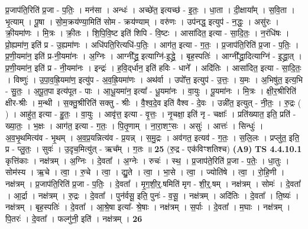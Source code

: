 \documentclass[17pt]{extarticle}
\begin{document}
                  प्र॒जाप॑ति॒रिति॑ प्र॒जा - प॒तिः॒ । मन॑सा । अन्धः॑ । अच्छे॑त॒ इत्यच्छ॑ - इ॒तः॒ । धा॒ता । दी॒क्षाया᳚म् । स॒वि॒ता । भृ॒त्याम् । पू॒षा । सो॒म॒क्रय॑ण्या॒मिति॑ सोम - क्रय॑ण्याम् । वरु॑णः । उप॑नद्ध॒ इत्युप॑ - न॒द्धः॒ । असु॑रः । क्री॒यमा॑णः । मि॒त्रः । क्री॒तः । शि॒पि॒वि॒ष्ट इति॑ शिपि - वि॒ष्टः । आसा॑दित॒ इत्या - सा॒दि॒तः॒ । न॒रंधि॑षः । प्रो॒ह्यमा॑ण॒ इति॑ प्र - उ॒ह्यमा॑णः । अधि॑पति॒रित्यधि॑-प॒तिः॒ । आग॑त॒ इत्या - ग॒तः॒ । प्र॒जाप॑ति॒रिति॑ प्र॒जा - प॒तिः॒ । प्र॒णी॒यमा॑न॒ इति॑ प्र-नी॒यमा॑नः । अ॒ग्निः । आग्नी᳚द्ध्र॒ इत्याग्नि॑-इ॒द्ध्रे॒ । बृह॒स्पतिः॑ । आग्नी᳚द्ध्रा॒दित्याग्नि॑ - इ॒द्ध्रा॒त् । प्र॒णी॒यमा॑न॒ इति॑ प्र - नी॒यमा॑नः । इन्द्रः॑ । ह॒वि॒द्‌र्धान॒ इति॑ हविः - धाने᳚ । अदि॑तिः । आसा॑दित॒ इत्या - सा॒दि॒तः॒ । विष्णुः॑ । उ॒पा॒व॒ह्रि॒यमा॑ण॒ इत्यु॑प - अ॒व॒ह्रि॒यमा॑णः । अथ॑र्वा । उपो᳚त्त॒ इत्युप॑ - उ॒त्तः॒ । य॒मः । अ॒भिषु॑त॒ इत्य॒भि - सु॒तः॒ । अ॒पू॒त॒पा इत्य॑पूत - पाः । आ॒धू॒यमा॑न॒ इत्या᳚ - धू॒यमा॑नः । वा॒युः । पू॒यमा॑नः । मि॒त्रः । क्षी॒र॒श्रीरिति॑ क्षीर-श्रीः । म॒न्थी । स॒क्तु॒श्रीरिति॑ सक्तु - श्रीः । वै॒श्व॒दे॒व इति॑ वैश्व - दे॒वः । उन्नी॑त॒ इत्युत् - नी॒तः॒ । रु॒द्रः ( ) । आहु॑त॒ इत्या - हु॒तः॒ । वा॒युः । आवृ॑त्त॒ इत्या - वृ॒त्तः॒ । नृ॒चक्षा॒ इति॑ नृ - चक्षाः᳚ । प्रति॑ख्यात॒ इति॒ प्रति॑ - ख्या॒तः॒ । भ॒क्षः । आग॑त॒ इत्या - ग॒तः॒ । पि॒तृ॒णाम् । ना॒रा॒शꣳ॒॒सः । असुः॑ । आत्तः॑ । सिन्धुः॑ । अ॒व॒भृ॒थमित्य॑व - भृ॒थम् । अ॒व॒प्र॒यन्नित्य॑व - प्र॒यन्न् । स॒मु॒द्रः । अव॑गत॒ इत्यव॑ - ग॒तः॒ । स॒लि॒लः । प्रप्लु॑त॒ इति॒ प्र - प्लु॒तः॒ । सुवः॑ । उ॒दृच॒मित्यु॑त् - ऋच᳚म् । ग॒तः ॥ \textbf{  25 } \newline
                  \newline
                      (रु॒द्र - एक॑विꣳशतिश्च)  \textbf{(A9)} \newline \newline
                                \textbf{ TS 4.4.10.1} \newline
                  कृत्ति॑काः । नक्ष॑त्रम् । अ॒ग्निः । दे॒वता᳚ । अ॒ग्नेः । रुचः॑ । स्थ॒ । प्र॒जाप॑ते॒रिति॑ प्र॒जा - प॒तेः॒ । धा॒तुः । सोम॑स्य । ऋ॒चे । त्वा॒ । रु॒चे । त्वा॒ । द्यु॒ते । त्वा॒ । भा॒से । त्वा॒ । ज्योति॑षे । त्वा॒ । रो॒हि॒णी । नक्ष॑त्रम् । प्र॒जाप॑ति॒रिति॑ प्र॒जा - प॒तिः॒ । दे॒वता᳚ । मृ॒ग॒शी॒र्॒.षमिति॑ मृग - शी॒र्॒.षम् । नक्ष॑त्रम् । सोमः॑ । दे॒वता᳚ । आ॒र्द्रा । नक्ष॑त्रम् । रु॒द्रः । दे॒वता᳚ । पुन॑र्वसू॒ इति॒ पुनः॑ - व॒सू॒ । नक्ष॑त्रम् । अदि॑तिः । दे॒वता᳚ । ति॒ष्यः॑ । नक्ष॑त्रम् । बृह॒स्पतिः॑ । दे॒वता᳚ । आ॒श्रे॒षा इत्या᳚- श्रे॒षाः । नक्ष॑त्रम् । स॒र्पाः । दे॒वता᳚ । म॒घाः । नक्ष॑त्रम् । पि॒तरः॑ । दे॒वता᳚ । फल्गु॑नी॒ इति॑ । नक्ष॑त्रम् । \textbf{  26} \newline
\end{document}
